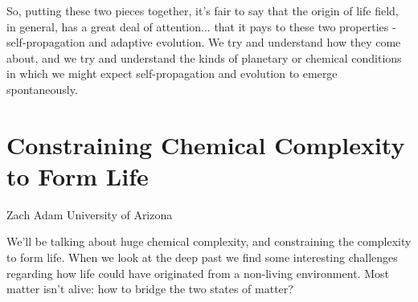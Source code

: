\documentclass[]{article}
\begin{document}
So, putting these
two pieces together,
it's fair to say that
the origin of life field,
in general, has a great deal
of attention...
that it pays to these two properties -
self-propagation and adaptive evolution.
We try and understand
how they come about,
and we try and understand the kinds
of planetary or chemical conditions
in which we might expect
self-propagation and evolution
to emerge spontaneously.



\section{Constraining Chemical Complexity to Form Life}

Zach Adam
University of Arizona

We'll be talking about huge chemical complexity, and constraining the complexity to form life. When we look at the deep past we find some interesting challenges regarding how life could have originated from a non-living environment. Most matter isn't alive: how to bridge the two states of matter?
\end{document}

